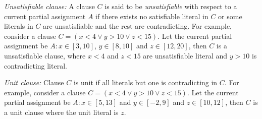 \textit{Unsatisfiable clause:}
A clause $C$ is said to be {\em unsatisfiable} with respect to a current partial 
assignment $A$ if there exists no satisfiable literal in $C$ or some literals in 
$C$ are unsatisfiable and the rest are contradicting. For example, consider a 
clause $C=(x<4 \vee y>10 \vee z<15)$.  Let the current partial assignment be 
$A: x \in [3,10]$, $y \in [8,10]$ and $z \in [12,20]$, then $C$ is a unsatisfiable 
clause, where $x<4$ and $z<15$ are unsatisfiable literal and $y>10$ is
contradicting literal. 

\textit{Unit clause:}
Clause $C$ is unit if all literals but one is contradicting in $C$. 
For example, consider a clause $C=(x<4 \vee y>10 \vee z<15)$. Let the 
current partial assignment be $A: x \in [5,13]$ and $y \in [-2,9]$ and $z \in
[10,12]$, then $C$ is a unit clause where the unit literal is $z$. 


